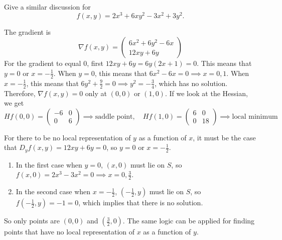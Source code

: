 	\begin{exercise}[Rudin 9.22]
		Give a similar discussion for
		\begin{equation}
			f(x,y)=2x^3+6xy^2-3x^2+3y^2.
		\end{equation}
	\end{exercise}
	\begin{solution}
	  The gradient is 
		\begin{equation}
			\nabla f(x, y) = \begin{pmatrix} 
				6x^2 + 6y^2 - 6x \\ 
				12xy + 6y 
			\end{pmatrix}
		\end{equation}
		For the gradient to equal $0$, first $12xy + 6y = 6y (2x + 1) = 0$. This means that $y = 0$ or $x = -\frac{1}{2}$. When $y = 0$, this means that $6x^2 - 6x = 0 \implies x = 0, 1$. When $x = -\frac{1}{2}$, this means that $6y^2 + \frac{9}{2} = 0 \implies y^2 = -\frac{3}{4}$, which has no solution. Therefore, $\nabla f(x, y) = 0$ only at $(0, 0)$ or $(1, 0)$. If we look at the Hessian, we get 
		\begin{equation}
			Hf(0, 0) = \begin{pmatrix} -6 & 0 \\ 0 & 6 \end{pmatrix} \implies \text{saddle point}, \quad Hf(1, 0) = \begin{pmatrix} 6 & 0 \\ 0 & 18 \end{pmatrix} \implies \text{local minimum}
		\end{equation}

		For there to be no local representation of $y$ as a function of $x$, it must be the case that $D_y f(x, y) = 12xy + 6y = 0$, so $y = 0$ or $x = -\frac{1}{2}$. 
		\begin{enumerate}
			\item In the first case when $y = 0$, $(x, 0)$ must lie on $S$, so $f(x, 0) = 2x^3 - 3x^2 = 0 \implies x = 0, \frac{3}{2}$. 
			\item In the second case when $x = -\frac{1}{2}$, $(-\frac{1}{2}, y)$ must lie on $S$, so $f(-\frac{1}{2}, y) = -1 = 0$, which implies that there is no solution.
		\end{enumerate}
		So only points are $(0, 0)$ and $(\frac{3}{2}, 0)$. The same logic can be applied for finding points that have no local representation of $x$ as a function of $y$. 
	\end{solution}

